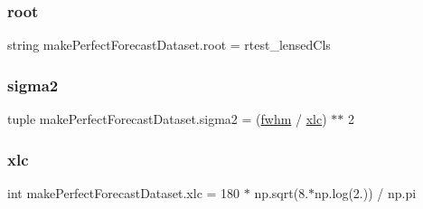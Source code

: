 \subsubsection{\texorpdfstring{root}{root}}
{\footnotesize\ttfamily string make\+Perfect\+Forecast\+Dataset.\+root = r\textquotesingle{}test\+\_\+lensed\+Cls\textquotesingle{}}

\mbox{\label{namespacemakePerfectForecastDataset_adeabcd27069a59a0a0f602925dd8a04d}} 
\subsubsection{\texorpdfstring{sigma2}{sigma2}}
{\footnotesize\ttfamily tuple make\+Perfect\+Forecast\+Dataset.\+sigma2 = (\mbox{\hyperlink{namespacemakePerfectForecastDataset_aff69188f85ce4067ad5f87e6b1b4a9c9}{fwhm}} / \mbox{\hyperlink{namespacemakePerfectForecastDataset_ab11003fb8a8c895cfe8d425639dde9cc}{xlc}}) $\ast$$\ast$ 2}

\mbox{\label{namespacemakePerfectForecastDataset_ab11003fb8a8c895cfe8d425639dde9cc}} 
\subsubsection{\texorpdfstring{xlc}{xlc}}
{\footnotesize\ttfamily int make\+Perfect\+Forecast\+Dataset.\+xlc = 180 $\ast$ np.\+sqrt(8.$\ast$np.\+log(2.)) / np.\+pi}

